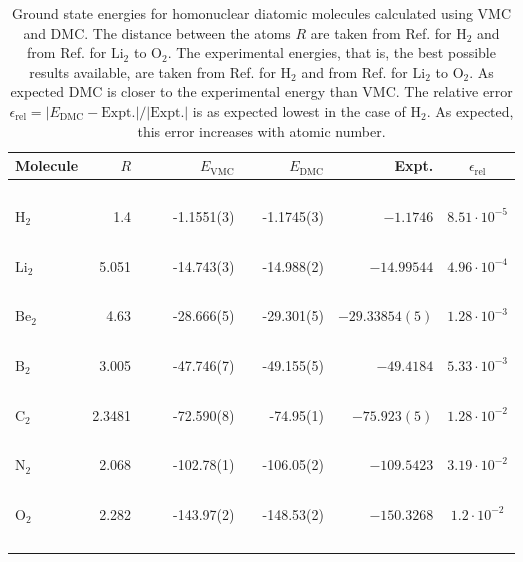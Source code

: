 \begin{table}
\begin{center}
\begin{tabular}{lrccrlrrc}
Molecule & $R$ & & \qquad & $E_\mathrm{VMC}$ & & \qquad $E_\mathrm{DMC}$ & \qquad\,\, Expt. & \qquad $\epsilon_\mathrm{rel}$\\
\hline\hline
\ \\
$\mathrm{H_2}$ & 1.4   & &\qquad & -1.1551(3)    & \qquad   & -1.1745(3)   & \qquad $-1.1746$      & \qquad $8.51\cdot 10^{-5}$ \\
\ \\
$\mathrm{Li_2}$& 5.051 & &\qquad & -14.743(3)    & \qquad   & -14.988(2)   & \qquad $-14.99544$    & \qquad $4.96\cdot 10^{-4}$ \\
\ \\
$\mathrm{Be_2}$& 4.63  & &\qquad & -28.666(5)    & \qquad   & -29.301(5)   & \qquad $-29.33854(5)$ & \qquad $1.28\cdot 10^{-3}$  \\
\ \\
$\mathrm{B_2}$ & 3.005 & &\qquad & -47.746(7)    & \qquad   & -49.155(5)   & \qquad $-49.4184$     & \qquad $5.33\cdot 10^{-3}$  \\
\ \\
$\mathrm{C_2}$ & 2.3481& &\qquad & -72.590(8)    & \qquad   & -74.95(1)    & \qquad $-75.923(5)$   & \qquad $1.28\cdot 10^{-2}$  \\
\ \\
$\mathrm{N_2}$ & 2.068 & &\qquad & -102.78(1)    & \qquad   & -106.05(2)   & \qquad $-109.5423$    & \qquad $3.19\cdot 10^{-2}$  \\
\ \\
$\mathrm{O_2}$ & 2.282 & &\qquad & -143.97(2)    & \qquad   & -148.53(2)   & \qquad $-150.3268$    & \qquad $1.2\cdot 10^{-2}$  \\
\ \\
\end{tabular}
\caption{Ground state energies for homonuclear diatomic molecules calculated using VMC and DMC. The distance between the atoms $R$ are taken from Ref. \cite{H_He_exact} for $\mathrm{H_2}$ and from Ref. \cite{UmrigarMolecules} for $\mathrm{Li_2}$ to $\mathrm{O_2}$. The experimental energies, that is, the best possible results available, are taken from Ref. \cite{H_He_exact} for $\mathrm{H_2}$ and from Ref. \cite{ExactMolecules} for $\mathrm{Li_2}$ to $\mathrm{O_2}$. As expected DMC is closer to the experimental energy than VMC. The relative error $\epsilon_\mathrm{rel} = |E_\mathrm{DMC} - \mathrm{Expt.}|/|\mathrm{Expt.}|$ is as expected lowest in the case of $\mathrm{H_2}$. As expected, this error increases with atomic number.}
\label{tab:MoleculesRes}
\end{center}
\end{table}

